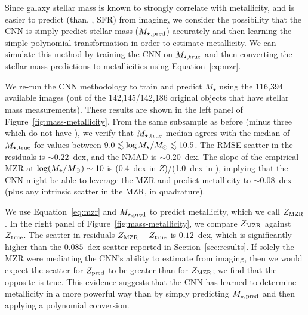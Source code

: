 \documentclass[fleqn,usenatbib]{mnras}
\begin{document}
Since galaxy stellar mass is known to strongly correlate with metallicity, and is easier to predict (than, \eg, SFR) from \sdssi\sdssr\sdssg{} imaging, we consider the possibility that the CNN is simply predict stellar mass ($M_{\star,\rm pred}$) accurately and then learning the simple polynomial transformation in order to estimate metallicity. We can simulate this method by training the CNN on $M_{\star, \rm true}$ and then converting the stellar mass predictions to metallicities using Equation~\ref{eq:mzr}.

We re-run the CNN methodology to train and predict $M_{\star}$ using the 116,394 available images (out of the 142,145/142,186 original objects that have stellar mass measurements). These results are shown in the left panel of Figure~\ref{fig:mass-metallicity}. From the same subsample as before (minus three which do not have \mstar), we verify that $M_{\rm \star, true}$ median agrees with the median of $M_{\rm \star, true}$ for values between $9.0 \lesssim \log \hbox{$M_{\star}$} /\hbox{$M_\odot$} \lesssim 10.5$. The RMSE scatter in the \mstar{} residuals is $\sim 0.22$~dex, and the NMAD is $\sim 0.20$~dex. The slope of the empirical MZR at $\log (\hbox{$M_{\star}$} / \hbox{$M_\odot$}) \sim 10$ is (0.4~dex in $Z$)/(1.0~dex in \mstar), implying that the CNN might be able to leverage the MZR and predict metallicity to $\sim 0.08$~dex (plus any intrinsic scatter in the MZR, in quadrature).


We use Equation~\ref{eq:mzr} and $M_{\star,\rm pred}$ to predict metallicity, which we call $Z_{\rm MZR}$. In the right panel of Figure~\ref{fig:mass-metallicity}, we compare $Z_{\rm MZR}$ against $Z_{\rm true}$. The scatter in residuals $Z_{\rm MZR} - Z_{\rm true}$ is $0.12$~dex, which is significantly higher than the $0.085$~dex scatter reported in Section~\ref{sec:results}. 
If solely the MZR were mediating the CNN's ability to estimate from 
\sdssi\sdssr{} imaging, then we would expect the scatter for $Z_{\rm pred}$ to be greater than for $Z_{\rm MZR}$; we find that the opposite is true. This evidence suggests that the CNN has learned to determine metallicity in a more powerful way than by simply predicting $M_{\rm \star,pred}$ and then applying a polynomial conversion.
\end{document}
